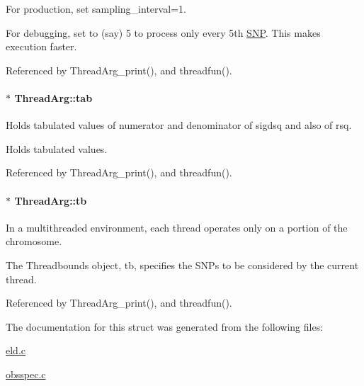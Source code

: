 \-For production, set sampling\-\_\-interval=1. 

\-For debugging, set to (say) 5 to process only every 5th \hyperlink{struct_s_n_p}{\-S\-N\-P}. \-This makes execution faster. 

\-Referenced by \-Thread\-Arg\-\_\-print(), and threadfun().

\hypertarget{struct_thread_arg_a4a020cb6c5951bbe5d51af918d1fe0dd}{
\paragraph[{tab}]{ $\ast$ {\bf \-Thread\-Arg\-::tab}}}\label{struct_thread_arg_a4a020cb6c5951bbe5d51af918d1fe0dd}


\-Holds tabulated values of numerator and denominator of sigdsq and also of rsq. 

\-Holds tabulated values.

\-Referenced by \-Thread\-Arg\-\_\-print(), and threadfun().

\hypertarget{struct_thread_arg_a7078358812327f5b261c8b7b48d02b7f}{
\paragraph[{tb}]{ $\ast$ {\bf \-Thread\-Arg\-::tb}}}\label{struct_thread_arg_a7078358812327f5b261c8b7b48d02b7f}


\-In a multithreaded environment, each thread operates only on a portion of the chromosome. 

\-The \-Threadbounds object, tb, specifies the \-S\-N\-Ps to be considered by the current thread. 

\-Referenced by \-Thread\-Arg\-\_\-print(), and threadfun().



\-The documentation for this struct was generated from the following files\-:\begin{DoxyCompactItemize}
\item 
\hyperlink{eld_8c}{eld.\-c}\item 
\hyperlink{obsspec_8c}{obsspec.\-c}\end{DoxyCompactItemize}
